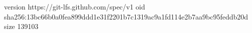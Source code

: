 version https://git-lfs.github.com/spec/v1
oid sha256:13bc66b0a0fea899ddd1e31f2201b7c1319ac9a1fd114e2b7aa9bc95feddb20d
size 139103
